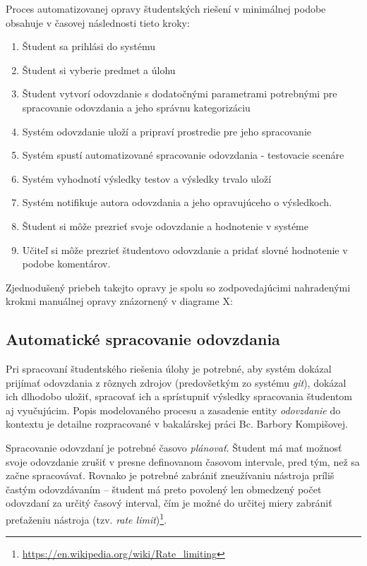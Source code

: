 \documentclass[
  digital, %
  twoside, %
  table,   %
  lof,     %
  lot,     %
]{fithesis3}
\begin{document}
Proces automatizovanej opravy študentských riešení v minimálnej podobe obsahuje v časovej následnosti tieto kroky:
\begin{enumerate}
    \item Študent sa prihlási do systému
    \item Študent si vyberie predmet a úlohu
    \item Študent vytvorí odovzdanie s dodatočnými parametrami potrebnými pre spracovanie odovzdania a jeho správnu kategorizáciu
    \item Systém odovzdanie uloží a pripraví prostredie pre jeho spracovanie
    \item Systém spustí automatizované spracovanie odovzdania - testovacie scenáre
    \item Systém vyhodnotí výsledky testov a výsledky trvalo uloží
    \item Systém notifikuje autora odovzdania a jeho opravujúceho o výsledkoch.
    \item Študent si môže prezrieť svoje odovzdanie a hodnotenie v systéme
    \item Učiteľ si môže prezrieť študentovo odovzdanie a pridať slovné hodnotenie v podobe komentárov. 
\end{enumerate}

Zjednodušený priebeh takejto opravy je spolu so zodpovedajúcimi nahradenými krokmi manuálnej opravy znázornený v diagrame X:


\subsection{Automatické spracovanie odovzdania}

Pri spracovaní študentského riešenia úlohy je potrebné, aby systém dokázal prijímať odovzdania z rôznych zdrojov (predovšetkým zo systému \emph{git}), dokázal ich dlhodobo uložiť, spracovať ich a sprístupniť výsledky spracovania študentom aj vyučujúcim. Popis modelovaného procesu a zasadenie entity \textit{odovzdanie} do kontextu je detailne rozpracované v bakalárskej práci Bc. Barbory Kompišovej\cite{kontr-portal}.

Spracovanie odovzdaní je potrebné časovo \emph{plánovať}. Študent má mať možnosť svoje odovzdanie zrušiť v presne definovanom časovom intervale, pred tým, než sa začne spracovávať. Rovnako je potrebné zabrániť zneužívaniu nástroja príliš častým odovzdávaním -- študent má preto povolený len obmedzený počet odovzdaní za určitý časový interval, čím je možné do určitej miery zabrániť preťaženiu nástroja (tzv. \emph{rate limit})\footnote{\url{https://en.wikipedia.org/wiki/Rate_limiting}}.
\end{document}

